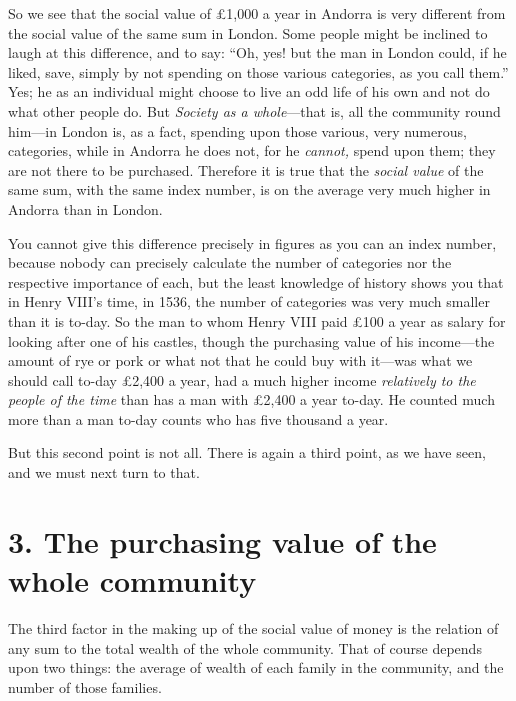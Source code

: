 \documentclass{book}
\begin{document}
So we see that the social value of £1,000 a year in Andorra is very different from the social value of the same sum in London. Some people might be inclined to laugh at this difference, and to say: “Oh, yes! but the man in London could, if he liked, save, simply by not spending on those various categories, as you call them.” Yes; he as an individual might choose to live an odd life of his own and not do what other people do. But \emph{Society as a whole}—that is, all the community round him—in London is, as a fact, spending upon those various, very numerous, categories, while in Andorra he does not, for he \emph{cannot,} spend upon them; they are not there to be purchased. Therefore it is true that the \emph{social value} of the same sum, with the same index number, is on the average very much higher in Andorra than in London.

You cannot give this difference precisely in figures as you can an index number, because nobody can precisely calculate the number of categories nor the respective importance of each, but the least knowledge of history shows you that in Henry VIII’s time, in 1536, the number of categories was very much smaller than it is to-day. So the man to whom Henry VIII paid £100 a year as salary for looking after one of his castles, though the purchasing value of his income—the amount of rye or pork or what not that he could buy with it—was what we should call to-day £2,400 a year, had a much higher income \emph{relatively to the people of the time} than has a man with £2,400 a year to-day. He counted much more than a man to-day counts who has five thousand a year.

But this second point is not all. There is again a third point, as we have seen, and we must next turn to that.

\section*{3. The purchasing value of the whole community}
The third factor in the making up of the social value of money is the relation of any sum to the total wealth of the whole community. That of course depends upon two things: the average of wealth of each family in the community, and the number of those families.
\end{document}
